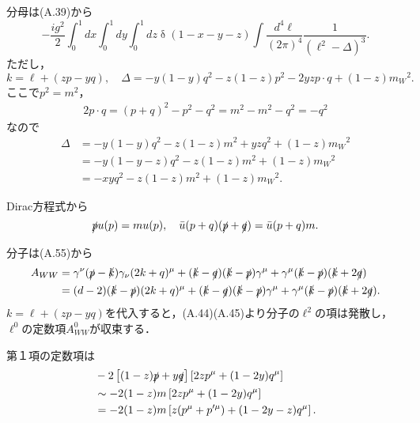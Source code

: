 分母は(A.39)から
\[ -\frac{ig^2}{2} \int_0^1 dx \int_0^1 dy \int_0^1 dz \mathop{\delta}(1-x-y-z) \int\frac{d^4\ell}{(2\pi)^4} \frac{1}{(\ell^2-\Delta)^3} . \]
ただし，
\[ k = \ell + (zp-yq) , \quad \Delta = - y(1-y)q^2 - z(1-z)p^2 - 2yz p\cdot q + (1-z) m_W{}^2 . \]
ここで\(p^2 = m^2\)，
\begin{align}
  2 p\cdot q = (p+q)^2 - p^2 - q^2 = m^2 - m^2 - q^2 = -q^2 \label{problem21_1_2pq}
\end{align}
なので
\begin{align*}
  \Delta &= - y(1-y)q^2 - z(1-z)m^2 + yz q^2 + (1-z) m_W{}^2 \\
  &= -y(1-y-z)q^2 - z(1-z) m^2 + (1-z) m_W{}^2 \\
  &= - xyq^2 - z(1-z) m^2 + (1-z) m_W{}^2.
\end{align*}

Dirac方程式から
\[\slashed{p} u(p) = m u(p) , \quad \bar{u}(p+q) (\slashed{p}+\slashed{q}) = \bar{u}(p+q) m .\]

分子は(A.55)から
\begin{align*}
  A_{WW} &= \gamma^\nu(\slashed{p}-\slashed{k})\gamma_\nu(2k+q)^\mu
  + (\slashed{k}-\slashed{q}) (\slashed{k}-\slashed{p}) \gamma^\mu
  + \gamma^\mu (\slashed{k}-\slashed{p}) (\slashed{k}+2\slashed{q}) \\
  &= (d-2)(\slashed{k}-\slashed{p}) (2k+q)^\mu
  + (\slashed{k}-\slashed{q}) (\slashed{k}-\slashed{p}) \gamma^\mu
  + \gamma^\mu (\slashed{k}-\slashed{p}) (\slashed{k}+2\slashed{q}) .
\end{align*}
\(k = \ell + (zp-yq)\)を代入すると，(A.44)(A.45)より分子の\(\ell^2\)の項は発散し，\(\ell^0\)の定数項\(A_{WW}^0\)が収束する．

第１項の定数項は
\begin{align*}
  & -2 \left[ (1-z) \slashed{p} + y \slashed{q} \right] \left[ 2zp^\mu + (1-2y) q^\mu \right] \\
  &\sim -2(1-z)m \left[ 2zp^\mu + (1-2y) q^\mu \right] \\
  &= -2(1-z)m \left[ z(p^\mu+p'^\mu) + (1-2y-z) q^\mu \right] .
\end{align*}

